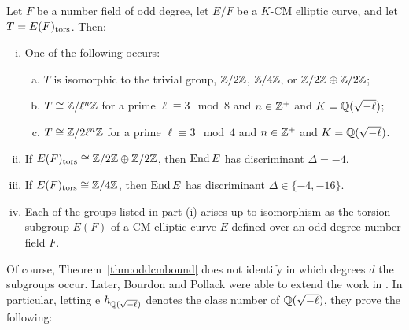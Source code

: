 \begin{thm} \label{thm:oddcmbound}
Let $F$ be a number field of odd degree, let $E/F$ be a $K$-CM elliptic curve, and let $T= E(F)_{\text{tors}}$. Then:
	\begin{enumerate}[(i)]
	\item One of the following occurs:
		\begin{enumerate}[(a)]
		\item $T$ is isomorphic to the trivial group, $\mathbb{Z}/2\mathbb{Z}$, $\mathbb{Z}/4\mathbb{Z}$, or $\mathbb{Z}/2\mathbb{Z} \oplus \mathbb{Z}/2\mathbb{Z}$;
		\item $T \cong \mathbb{Z}/\ell^n\mathbb{Z}$ for a prime $\ell \equiv 3 \mod 8$ and $n \in \mathbb{Z}^+$ and $K= \mathbb{Q}(\sqrt{-\ell})$;
		\item $T \cong \mathbb{Z}/2\ell^n\mathbb{Z}$ for a prime $\ell \equiv 3 \mod 4$ and $n \in \mathbb{Z}^+$ and $K= \mathbb{Q}(\sqrt{-\ell})$.
		\end{enumerate}
	\item If $E(F)_{\text{tors}} \cong \mathbb{Z}/2\mathbb{Z} \oplus \mathbb{Z}/2\mathbb{Z}$, then $\operatorname{End} E$ has discriminant $\Delta= -4$.
	\item If $E(F)_{\text{tors}} \cong \mathbb{Z}/4\mathbb{Z}$, then $\operatorname{End} E$ has discriminant $\Delta \in \{-4, -16 \}$. 
	\item Each of the groups listed in part (i) arises up to isomorphism as the torsion subgroup $E(F)$ of a CM elliptic curve $E$ defined over an odd degree number field $F$.
	\end{enumerate}
\end{thm}


Of course, Theorem~\ref{thm:oddcmbound} does not identify in which degrees $d$ the subgroups occur. Later, Bourdon and Pollack were able to extend the work in \cite{bourdonclarkstankewicz17}. In particular, letting e $h_{\mathbb{Q}(\sqrt{-\ell})}$ denotes the class number of $\mathbb{Q}(\sqrt{-\ell})$, they prove the following:


